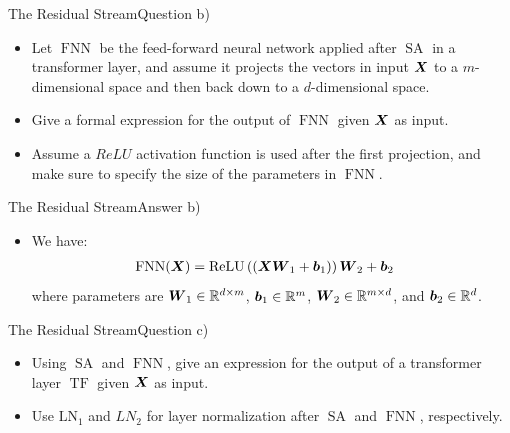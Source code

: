 \documentclass[t]{beamer}
\newcommand\op[1]{\operatorname{#1}}
\begin{document}
\begin{frame}{The Residual Stream}{Question b)}
    \begin{itemize}
        \item Let $\op{FNN}$ be the feed-forward neural network applied after
              $\op{SA}$ in a transformer layer, and assume it projects the
              vectors in input ${\boldsymbol{X}}$ to a $m$-dimensional space and then back
              down to a $d$-dimensional space.
        \item Give a formal expression for the output of $\op{FNN}$ given ${\boldsymbol{X}}$
              as input.
        \item Assume a $ReLU$ activation function is used after the first
              projection, and make sure to specify the size of the parameters
              in $\op{FNN}$.
    \end{itemize}
\end{frame}

\begin{frame}{The Residual Stream}{Answer b)}
    \begin{itemize}
        \item We have:
              \begin{align}
                  \op{FNN}(\mX) & = \text{ReLU}\left((\mX\mW_1 + \vb_1)\right)\mW_2 + \vb_2
              \end{align}
              where parameters are ${\boldsymbol{W}}_1\in\mathbb{R}^{d\times m}$,
              ${\boldsymbol{b}}_1\in\mathbb{R}^m$, ${\boldsymbol{W}}_2\in\mathbb{R}^{m\times d}$, and
              ${\boldsymbol{b}}_2\in\mathbb{R}^d$.
    \end{itemize}
\end{frame}

\begin{frame}{The Residual Stream}{Question c)}
    \begin{itemize}
        \item Using $\op{SA}$ and $\op{FNN}$, give an expression for the output
              of a transformer layer $\op{TF}$ given ${\boldsymbol{X}}$ as input.
        \item Use $\op{LN_1}$ and ${LN_2}$ for layer normalization after
              $\op{SA}$ and $\op{FNN}$, respectively.
    \end{itemize}
\end{frame}
\end{document}
